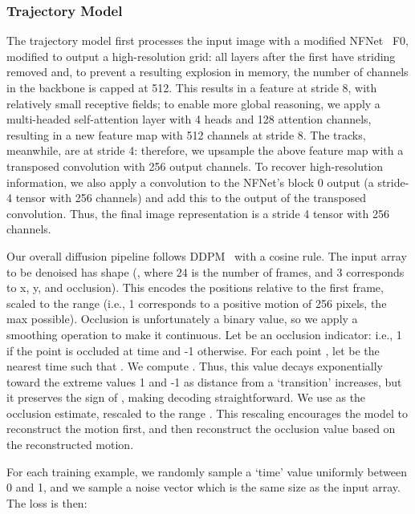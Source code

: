 \documentclass[10pt,twocolumn,letterpaper]{article}
\begin{document}
\subsubsection{Trajectory Model}
The trajectory model first processes the input image with a modified NFNet~\cite{brock2021high} F0, modified to output a high-resolution grid: all layers after the first have striding removed and, to prevent a resulting explosion in memory, the number of channels in the backbone is capped at 512.  This results in a feature at stride 8, with relatively small receptive fields; to enable more global reasoning, we apply a multi-headed self-attention layer with 4 heads and 128 attention channels, resulting in a new feature map with 512 channels at stride 8.  The tracks, meanwhile, are at stride 4: therefore, we upsample the above feature map with a transposed convolution with 256 output channels.  To recover high-resolution information, we also apply a convolution to the NFNet's block 0 output (a stride-4 tensor with 256 channels) and add this to the output of the transposed convolution.  Thus, the final image representation  is a stride 4 tensor with 256 channels.

Our overall diffusion pipeline follows DDPM~\cite{ho2020denoising} with a cosine rule.  The input array to be denoised has shape (, where 24 is the number of frames, and 3 corresponds to x, y, and occlusion).  This encodes the  positions relative to the first frame, scaled to the range  (i.e., 1 corresponds to a positive motion of 256 pixels, the max possible).  Occlusion is unfortunately a binary value, so we apply a smoothing operation to make it continuous.  Let  be an occlusion indicator: i.e., 1 if the point is occluded at time  and -1 otherwise.  For each point , let  be the nearest time such that .  We compute .  Thus, this value decays exponentially toward the extreme values 1 and -1 as distance from a `transition' increases, but it preserves the sign of , making decoding straightforward.  We use  as the occlusion estimate, rescaled to the range .  This rescaling encourages the model to reconstruct the motion first, and then reconstruct the occlusion value based on the reconstructed motion.

For each training example, we randomly sample a `time' value  uniformly between 0 and 1, and we sample a noise vector  which is the same size as the input array.  The loss is then:
\end{document}
